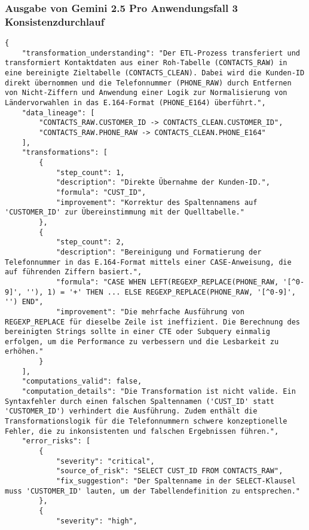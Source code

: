 \subsubsection{Ausgabe von Gemini 2.5 Pro Anwendungsfall 3 Konsistenzdurchlauf}\label{anhang:subsubsec:gemini_case3_prompt2}
\begin{lstlisting}[caption={Ausgabe: Gemini 2.5 Pro Anwendungsfall 3 Konsistenzdurchlauf},label={gemini_case3_prompt2}]
{
    "transformation_understanding": "Der ETL-Prozess transferiert und transformiert Kontaktdaten aus einer Roh-Tabelle (CONTACTS_RAW) in eine bereinigte Zieltabelle (CONTACTS_CLEAN). Dabei wird die Kunden-ID direkt übernommen und die Telefonnummer (PHONE_RAW) durch Entfernen von Nicht-Ziffern und Anwendung einer Logik zur Normalisierung von Ländervorwahlen in das E.164-Format (PHONE_E164) überführt.",
    "data_lineage": [
        "CONTACTS_RAW.CUSTOMER_ID -> CONTACTS_CLEAN.CUSTOMER_ID",
        "CONTACTS_RAW.PHONE_RAW -> CONTACTS_CLEAN.PHONE_E164"
    ],
    "transformations": [
        {
            "step_count": 1,
            "description": "Direkte Übernahme der Kunden-ID.",
            "formula": "CUST_ID",
            "improvement": "Korrektur des Spaltennamens auf 'CUSTOMER_ID' zur Übereinstimmung mit der Quelltabelle."
        },
        {
            "step_count": 2,
            "description": "Bereinigung und Formatierung der Telefonnummer in das E.164-Format mittels einer CASE-Anweisung, die auf führenden Ziffern basiert.",
            "formula": "CASE WHEN LEFT(REGEXP_REPLACE(PHONE_RAW, '[^0-9]', ''), 1) = '+' THEN ... ELSE REGEXP_REPLACE(PHONE_RAW, '[^0-9]', '') END",
            "improvement": "Die mehrfache Ausführung von REGEXP_REPLACE für dieselbe Zeile ist ineffizient. Die Berechnung des bereinigten Strings sollte in einer CTE oder Subquery einmalig erfolgen, um die Performance zu verbessern und die Lesbarkeit zu erhöhen."
        }
    ],
    "computations_valid": false,
    "computation_details": "Die Transformation ist nicht valide. Ein Syntaxfehler durch einen falschen Spaltennamen ('CUST_ID' statt 'CUSTOMER_ID') verhindert die Ausführung. Zudem enthält die Transformationslogik für die Telefonnummern schwere konzeptionelle Fehler, die zu inkonsistenten und falschen Ergebnissen führen.",
    "error_risks": [
        {
            "severity": "critical",
            "source_of_risk": "SELECT CUST_ID FROM CONTACTS_RAW",
            "fix_suggestion": "Der Spaltenname in der SELECT-Klausel muss 'CUSTOMER_ID' lauten, um der Tabellendefinition zu entsprechen."
        },
        {
            "severity": "high",

\end{lstlisting}
